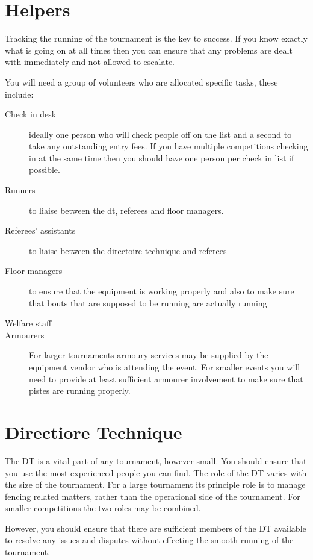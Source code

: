 \documentclass[a4paper,11pt]{memoir}
\begin{document}
\section{Helpers}

Tracking the running of the tournament is the key to success. If you know exactly what is going on at all times then you can ensure that any problems are dealt with immediately and not allowed to escalate. 

You will need a group of volunteers who are allocated specific tasks, these include:

\begin{description}
 \item[Check in desk] ideally one person who will check people off on the list and a second to take any outstanding entry fees. If you have multiple competitions checking in at the same time then you should have one person per check in list if possible.
 \item[Runners] to liaise between the \gls{dt}, referees and floor managers. 
 \item[Referees' assistants] to liaise between the \gls{directoire technique} and referees
 \item[Floor managers] to ensure that the equipment is working properly and also to make sure that bouts that are supposed to be running are actually running
 \item[Welfare staff]
 \item[Armourers] For larger tournaments armoury services may be supplied by the equipment vendor who is attending the event. For smaller events you will need to provide at least sufficient armourer involvement to make sure that pistes are running properly.
\end{description}

\section{Directiore Technique}

The DT is a vital part of any tournament, however small. You should ensure that you use the most experienced people you can find.
The role of the DT varies with the size of the tournament. For a large tournament its principle role is to manage fencing related matters, rather than the operational side of the tournament. For smaller competitions the two roles may be combined.

However, you should ensure that there are sufficient members of the DT available to resolve any issues and disputes without effecting the smooth running of the tournament.
\end{document}
